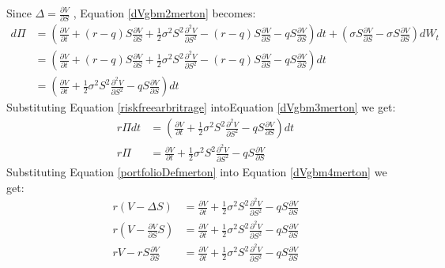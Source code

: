 \documentclass[12pt]{article}
\numberwithin{equation}{section}
\begin{document}
Since  $\Delta = \frac{\partial V}{\partial S}$ , Equation \ref{dVgbm2merton} becomes:
\begin{equation}
	\begin{aligned}
		d\Pi &= (\frac{\partial V}{\partial t} + (r-q)S \frac{\partial V}{\partial S} + 
		\frac{1}{2}\sigma^2S^2\frac{\partial^2 V}{\partial S^2} -  (r-q)S \frac{\partial V}{\partial S} - qS \frac{\partial V}{\partial S} ) dt + (\sigma S \frac{\partial V}{\partial S} -\sigma S \frac{\partial V}{\partial S} ) dW_t \\
		&= (\frac{\partial V}{\partial t} + (r-q)S \frac{\partial V}{\partial S} + 
		\frac{1}{2}\sigma^2S^2\frac{\partial^2 V}{\partial S^2} -  (r-q)S \frac{\partial V}{\partial S} - qS \frac{\partial V}{\partial S}) dt \\
		&= (\frac{\partial V}{\partial t} + 
		\frac{1}{2}\sigma^2S^2\frac{\partial^2 V}{\partial S^2} - qS \frac{\partial V}{\partial S}) dt
	\end{aligned}
	\label{dVgbm3merton}
\end{equation}
Substituting Equation \ref{riskfreearbritrage} intoEquation \ref{dVgbm3merton} we get:
\begin{equation}
	\begin{aligned}
		r\Pi dt &= (\frac{\partial V}{\partial t} + 
		\frac{1}{2}\sigma^2S^2\frac{\partial^2 V}{\partial S^2} - qS \frac{\partial V}{\partial S}) dt \\
		r\Pi &= \frac{\partial V}{\partial t} + 
		\frac{1}{2}\sigma^2S^2\frac{\partial^2 V}{\partial S^2} - qS \frac{\partial V}{\partial S}
	\end{aligned}
	\label{dVgbm4merton}
\end{equation}
Substituting Equation \ref{portfolioDefmerton} into Equation \ref{dVgbm4merton} we get:
\begin{equation}
	\begin{aligned}
		r(V - \Delta S)&= \frac{\partial V}{\partial t} + 
		\frac{1}{2}\sigma^2S^2\frac{\partial^2 V}{\partial S^2} - qS \frac{\partial V}{\partial S}\\
		r(V - \frac{\partial V}{\partial S} S)&= \frac{\partial V}{\partial t} + 
		\frac{1}{2}\sigma^2S^2\frac{\partial^2 V}{\partial S^2} - qS \frac{\partial V}{\partial S}  \\
		rV - rS\frac{\partial V}{\partial S} &= \frac{\partial V}{\partial t} + 
		\frac{1}{2}\sigma^2S^2\frac{\partial^2 V}{\partial S^2} - qS \frac{\partial V}{\partial S} 
	\end{aligned} 
	\label{dVgbm5merton}
\end{equation}
\end{document}
